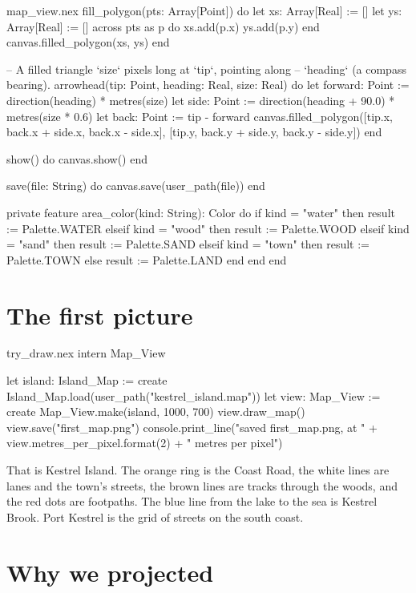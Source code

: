 \begin{continued}{map_view.nex}
  fill_polygon(pts: Array[Point]) do
    let xs: Array[Real] := []
    let ys: Array[Real] := []
    across pts as p do
      xs.add(p.x)
      ys.add(p.y)
    end
    canvas.filled_polygon(xs, ys)
  end

  -- A filled triangle `size` pixels long at `tip`, pointing along
  -- `heading` (a compass bearing).
  arrowhead(tip: Point, heading: Real, size: Real) do
    let forward: Point := direction(heading) * metres(size)
    let side: Point := direction(heading + 90.0) * metres(size * 0.6)
    let back: Point := tip - forward
    canvas.filled_polygon([tip.x, back.x + side.x, back.x - side.x],
      [tip.y, back.y + side.y, back.y - side.y])
  end

  show() do
    canvas.show()
  end

  save(file: String) do
    canvas.save(user_path(file))
  end

private feature
  area_color(kind: String): Color do
    if kind = "water" then
      result := Palette.WATER
    elseif kind = "wood" then
      result := Palette.WOOD
    elseif kind = "sand" then
      result := Palette.SAND
    elseif kind = "town" then
      result := Palette.TOWN
    else
      result := Palette.LAND
    end
  end
end
\end{continued}

\section{The first picture}

\begin{tryit}{try_draw.nex}
intern Map_View

let island: Island_Map := create Island_Map.load(user_path("kestrel_island.map"))
let view: Map_View := create Map_View.make(island, 1000, 700)
view.draw_map()
view.save("first_map.png")
console.print_line("saved first_map.png, at " + view.metres_per_pixel.format(2) + " metres per pixel")
\end{tryit}

That is Kestrel Island. The orange ring is the Coast Road, the white lines
are lanes and the town's streets, the brown lines are tracks through the
woods, and the red dots are footpaths. The blue line from the lake to the
sea is Kestrel Brook. Port Kestrel is the grid of streets on the south
coast.

\section{Why we projected}

